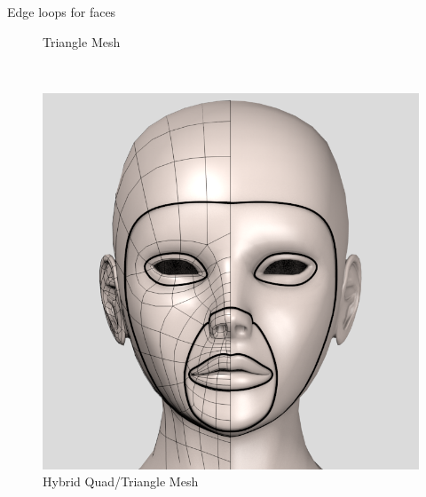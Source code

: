 \documentclass[10pt, compress, english]{beamer}
\begin{document}
\begin{frame}{Edge loops for faces}
\begin{center}
\begin{minipage}[c]{0.48\columnwidth}
\begin{figure}
\protect\caption{Triangle Mesh}
\end{figure}
%
\end{minipage}~%
\begin{minipage}[c]{0.48\columnwidth}%
\begin{figure}
\begin{centering}
\includegraphics[width=1\columnwidth]{img/quad_faces}
\par\end{centering}

\protect\caption{Hybrid Quad/Triangle Mesh}
\end{figure}
%
\end{minipage}
\par\end{center}

\end{frame}
\end{document}
